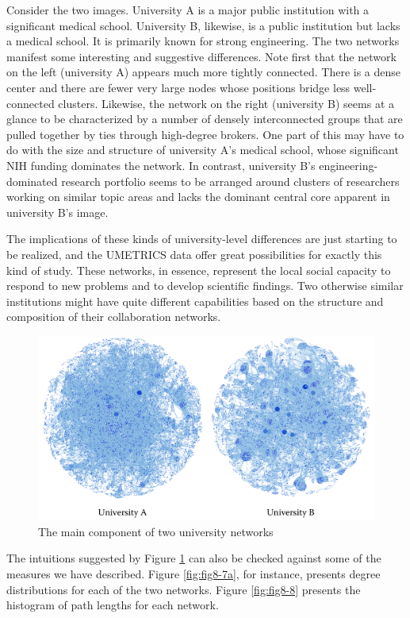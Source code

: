 \documentclass[]{krantz}
\begin{document}
Consider the two images. University A is a major public institution with
a significant medical school. University B, likewise, is a public
institution but lacks a medical school. It is primarily known for strong
engineering. The two networks manifest some interesting and suggestive
differences. Note first that the network on the left (university A)
appears much more tightly connected. There is a dense center and there
are fewer very large nodes whose positions bridge less well-connected
clusters. Likewise, the network on the right (university B) seems at a
glance to be characterized by a number of densely interconnected groups
that are pulled together by ties through high-degree brokers. One part
of this may have to do with the size and structure of university A's
medical school, whose significant NIH funding dominates the network. In
contrast, university B's engineering-dominated research portfolio seems
to be arranged around clusters of researchers working on similar topic
areas and lacks the dominant central core apparent in university B's
image.

The implications of these kinds of university-level differences are just
starting to be realized, and the UMETRICS data offer great possibilities
for exactly this kind of study. These networks, in essence, represent
the local social capacity to respond to new problems and to develop
scientific findings. Two otherwise similar institutions might have quite
different capabilities based on the structure and composition of their
collaboration networks.

\begin{figure}

{\centering \includegraphics[width=0.7\linewidth]{ChapterNetworks/figures/fig8-6} 

}

\caption{The main component of two university networks}\label{fig:fig8-6}
\end{figure}

The intuitions suggested by Figure \ref{fig:fig8-6} can also be checked
against some of the measures we have described. Figure
\ref{fig:fig8-7a}, for instance, presents degree distributions for each
of the two networks. Figure \ref{fig:fig8-8} presents the histogram of
path lengths for each network.
\end{document}
